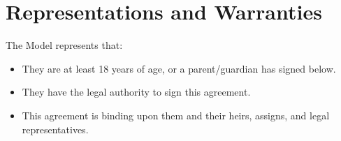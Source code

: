 
\section{Representations and Warranties}
\label{sec:warranties}

The Model represents that:

\begin{itemize}
  \item They are at least 18 years of age, or a parent/guardian has signed below.
  \item They have the legal authority to sign this agreement.
  \item This agreement is binding upon them and their heirs, assigns, and legal representatives.
\end{itemize}

